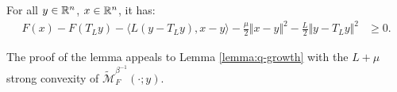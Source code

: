 \documentclass[12pt]{article}
\begin{document}
            \begin{lemma}\label{thm:prox-grad-ineq}
                For all $y \in \mathbb R^n$, $x \in \mathbb R^n$, it has: 
                \begin{align*}
                    F(x)  - F(T_Ly) - \langle L(y - T_Ly), x - y\rangle
                    - \frac{\mu}{2}\Vert x - y\Vert^2 - \frac{L}{2}\Vert y - T_Ly\Vert^2 
                    &\ge 0. 
                \end{align*}
            \end{lemma}
            The proof of the lemma appeals to Lemma \ref{lemma:q-growth} with the $L + \mu$ strong convexity of $\widetilde {\mathcal M}^{\beta^{-1}}_F(\cdot; y)$. 
            
\end{document}
